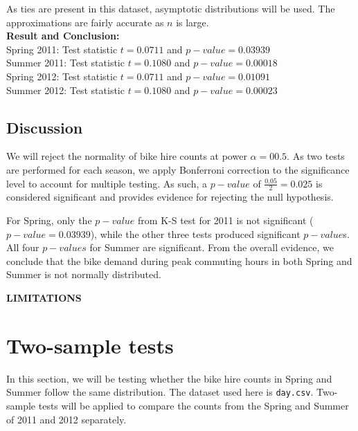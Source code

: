 As ties are present in this dataset, asymptotic distributions will be used. The approximations are fairly accurate as $n$ is large. \\
\textbf{Result and Conclusion:} \\
Spring 2011: Test statistic $t=0.0711$ and $p-value = 0.03939$ \\
Summer 2011: Test statistic $t=0.1080$ and $p-value = 0.00018$ \\
Spring 2012: Test statistic $t=0.0711$ and $p-value = 0.01091$ \\
Summer 2012: Test statistic $t=0.1080$ and $p-value = 0.00023$
 
\subsection{Discussion}
We will reject the normality of bike hire counts at power $\alpha=00.5$. As two tests are performed for each season, we apply Bonferroni correction to the significance level to account for multiple testing. As such, a $p-value$ of $\frac{0.05}{2}=0.025$ is considered significant and provides evidence for rejecting the null hypothesis.

For Spring, only the $p-value$ from K-S test for 2011 is not significant ($p-value = 0.03939$), while the other three tests produced significant $p-value$s. All four $p-values$ for Summer are significant.  From the overall evidence, we conclude that the bike demand during peak commuting hours in both Spring and Summer is not normally distributed.

\textbf{LIMITATIONS}

\section{Two-sample tests}
In this section, we will be testing whether the bike hire counts in Spring and Summer follow the same distribution. The dataset used here is \texttt{day.csv}. Two-sample tests will be applied to compare the counts from the Spring and Summer of 2011 and 2012 separately. 


